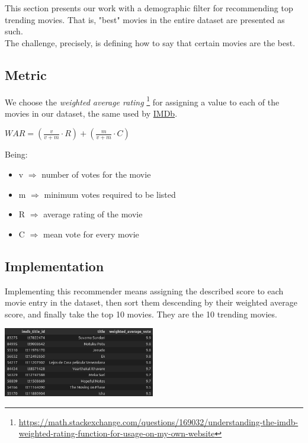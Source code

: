 This section presents our work with a demographic filter for recommending top trending movies.
That is, "best" movies in the entire dataset are presented as such.\\
The challenge, precisely, is defining how to say that certain movies are the best.

\subsection*{Metric}
We choose the \emph{weighted average rating}
\footnote{\href{https://math.stackexchange.com/questions/169032/understanding-the-imdb-weighted-rating-function-for-usage-on-my-own-website}{https://math.stackexchange.com/questions/169032/understanding-the-imdb-weighted-rating-function-for-usage-on-my-own-website}}
for assigning a value to each of the movies in our dataset, the same used by \href{https://www.imdb.com/chart/top?ref_=nb\_mv\_3\_chttp}{IMDb}.
\begin{center}
    \(WAR = \left(\frac{v}{v+m} \cdot R\right) + \left(\frac{m}{v+m} \cdot C\right)\)
\end{center}
Being:
\begin{itemize}
    \item v $\Rightarrow$ number of votes for the movie
    \item m $\Rightarrow$ minimum votes required to be listed
    \item R $\Rightarrow$ average rating of the movie
    \item C $\Rightarrow$ mean vote for every movie
\end{itemize}

\subsection*{Implementation}
Implementing this recommender means assigning the described score to each movie entry in the dataset,
then sort them descending by their weighted average score,
and finally take the top 10 movies. They are the 10 trending movies.
\begin{center}
    \captionsetup{type=figure}
    \includegraphics[width=250px]{images/demo-result.png}
\end{center} 
